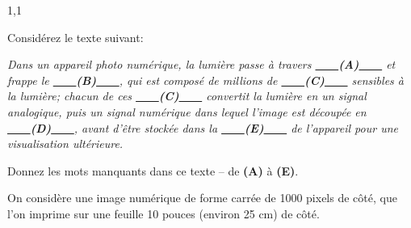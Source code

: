 \documentclass[11pt,a4paper]{exam}
\begin{document}
\begin{spacing}{1,1}
\begin{questions}
			\question[2 \half] Considérez le texte suivant:
			
			\textit{Dans un appareil photo numérique, la lumière passe à travers \uline{\ \ \ \ }\textbf{(A)}\uline{\ \ \ \ } et frappe le \uline{\ \ \ \ }\textbf{(B)}\uline{\ \ \ \ }, qui est composé de millions de \uline{\ \ \ \ }\textbf{(C)}\uline{\ \ \ \ } sensibles à la lumière; chacun de ces \uline{\ \ \ \ }\textbf{(C)}\uline{\ \ \ \ } convertit la lumière en un signal analogique, puis un signal numérique dans lequel l'image est découpée en \uline{\ \ \ \ }\textbf{(D)}\uline{\ \ \ \ }, avant d'être stockée dans la \uline{\ \ \ \ }\textbf{(E)}\uline{\ \ \ \ } de l'appareil pour une visualisation ultérieure.}
			
			Donnez les mots manquants dans ce texte -- de \textbf{(A)} à \textbf{(E)}.
			
			\question On considère une image numérique de forme carrée de 1000 pixels de côté, que l'on imprime sur une feuille 10 pouces (environ 25 cm) de côté.
			
  
        \end{questions}
    \end{spacing}
\end{document}

